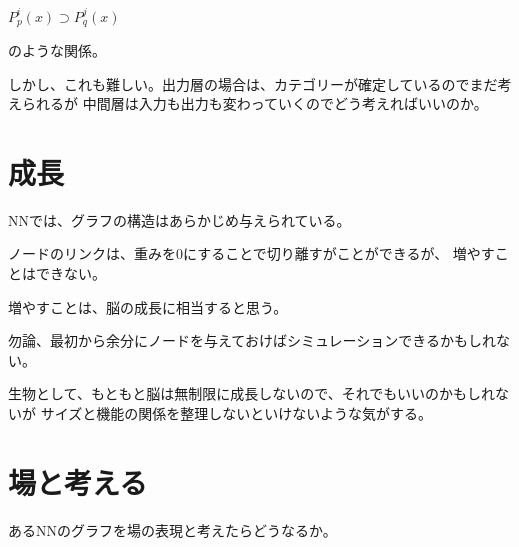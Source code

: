 \documentclass[10pt, oneside]{jarticle}   	%
\begin{document}
$P^i_p(x) \supset P^j_q(x)$

のような関係。

しかし、これも難しい。出力層の場合は、カテゴリーが確定しているのでまだ考えられるが
中間層は入力も出力も変わっていくのでどう考えればいいのか。



\section{成長}
NNでは、グラフの構造はあらかじめ与えられている。

ノードのリンクは、重みを0にすることで切り離すがことができるが、
増やすことはできない。

増やすことは、脳の成長に相当すると思う。

勿論、最初から余分にノードを与えておけばシミュレーションできるかもしれない。

生物として、もともと脳は無制限に成長しないので、それでもいいのかもしれないが
サイズと機能の関係を整理しないといけないような気がする。

\section{場と考える}
あるNNのグラフを場の表現と考えたらどうなるか。
\end{document}
